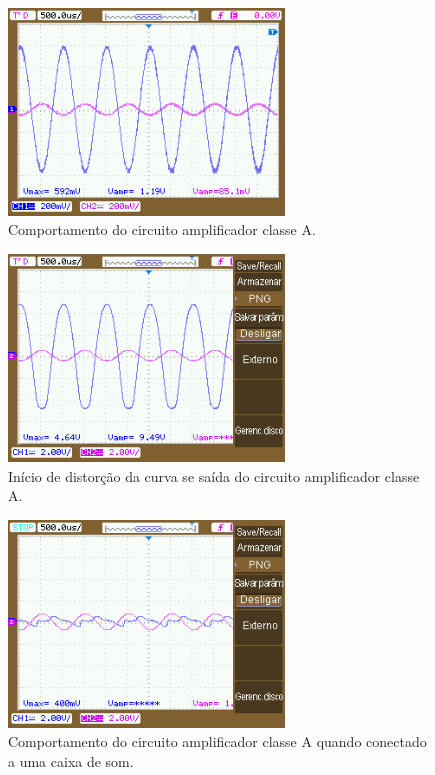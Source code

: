 \documentclass{article}
\begin{document}
\begin{figure}[h!]
    \centering
    \includegraphics[height=5.5cm]{imgSource/mosfetAmp.png}
    \caption{Comportamento do circuito amplificador classe A.}
    \label{fig:mos_amp}
\end{figure}

\begin{figure}[h!]
    \centering
    \includegraphics[height=5.5cm]{imgSource/amp900mVpp.png}
    \caption{Início de distorção da curva se saída do circuito amplificador classe A.}
    \label{fig:mos_dis}
\end{figure}

\begin{figure}[h!]
    \centering
    \includegraphics[height=5.5cm]{imgSource/ampCaixa.png}
    \caption{Comportamento do circuito amplificador classe A quando conectado a uma caixa de som.}
    \label{fig:mos_caixa}
\end{figure}
\end{document}
